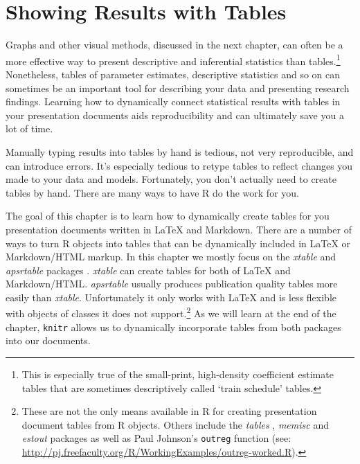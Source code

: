 



\chapter{Showing Results with Tables}\label{TablesChapter}

Graphs and other visual methods, discussed in the next chapter, can often be a more effective way to present descriptive and inferential statistics than tables.\footnote{This is especially true of the small-print, high-density coefficient estimate tables that are sometimes descriptively called `train schedule' tables.} Nonetheless, tables of parameter estimates, descriptive statistics and so on can sometimes be an important tool for describing your data and presenting research findings. Learning how to dynamically connect statistical results with tables in your presentation documents aids reproducibility and can ultimately save you a lot of time.

Manually typing results into tables by hand is tedious, not very reproducible, and can introduce errors. It's especially tedious to retype tables to reflect changes you made to your data and models. Fortunately, you don't actually need to create tables by hand. There are many ways to have R do the work for you. 

The goal of this chapter is to learn how to dynamically create tables for you presentation documents written in LaTeX and Markdown. There are a number of ways to turn R objects into tables that can be dynamically included in LaTeX or Markdown/HTML markup. In this chapter we mostly focus on the \emph{xtable} \cite[]{R-xtable} and \emph{apsrtable} packages \cite[]{R-apsrtable}. \emph{xtable} can create tables for both of LaTeX and Markdown/HTML. \emph{apsrtable} usually produces publication quality tables more easily than \emph{xtable}. Unfortunately it only works with LaTeX and is less flexible with objects of classes it does not support.\footnote{These are not the only means available in R for creating presentation document tables from R objects. Others include the \emph{tables} \citep{R-tables}, \emph{memisc} \citep{R-memisc} and \emph{estout} \citep{estout} packages as well as Paul Johnson's \texttt{outreg} function (see: \url{http://pj.freefaculty.org/R/WorkingExamples/outreg-worked.R}).} As we will learn at the end of the chapter, \texttt{knitr} allows us to dynamically incorporate tables from both packages into our documents.

